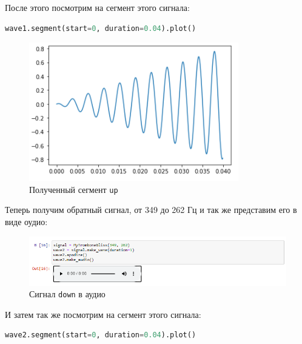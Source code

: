 \documentclass[a4paper]{article}
\begin{document}
            После этого посмотрим на сегмент этого сигнала:
            
\begin{lstlisting}[language=Python, caption= Сегмент сигнала \texttt{up}]
    wave1.segment(start=0, duration=0.04).plot()
\end{lstlisting}   
            
             \begin{figure}[H]
                \centering
                \includegraphics{ex_5_signal_up_segment.png}
                \caption{Полученный сегмент \texttt{up}}
                \label{fig:ex_5_signal_up_segment}
            \end{figure}
            
            Теперь получим обратный сигнал, от 349 до 262 Гц и так же представим его в виде оудио:
            
             \begin{figure}[H]
                \centering
                \includegraphics[width=\textwidth]{ex_5_signal_down_audio.png}
                \caption{Сигнал \texttt{down} в аудио}
                \label{fig:ex_5_signal_up_audio}
            \end{figure}
            
            И затем так же посмотрим на сегмент этого сигнала:
            
\begin{lstlisting}[language=Python, caption= Сегмент сигнала \texttt{down}]
    wave2.segment(start=0, duration=0.04).plot()
\end{lstlisting}   
            
\end{document}
